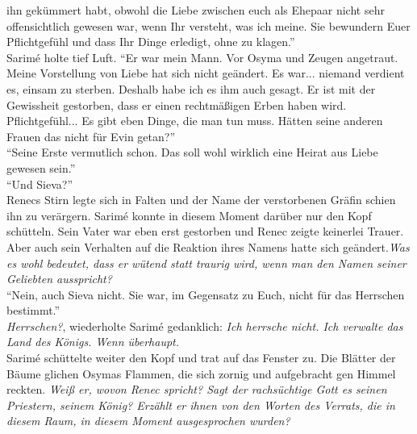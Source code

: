 ihn gekümmert habt, obwohl die Liebe zwischen euch als Ehepaar nicht sehr offensichtlich gewesen 
war, wenn Ihr versteht, was ich meine. Sie bewundern Euer Pflichtgefühl und dass Ihr Dinge 
erledigt, ohne zu klagen.''\\
Sarimé holte tief Luft. ``Er war mein Mann. Vor Osyma und Zeugen angetraut. Meine Vorstellung von 
Liebe hat sich nicht geändert. Es war... niemand verdient es, einsam zu sterben. Deshalb habe ich 
es ihm auch gesagt. Er ist mit der Gewissheit gestorben, dass er einen rechtmäßigen Erben haben 
wird. Pflichtgefühl... Es gibt eben Dinge, die man tun muss. Hätten seine anderen Frauen das nicht 
für Evin getan?''\\
``Seine Erste vermutlich schon. Das soll wohl wirklich eine Heirat aus Liebe gewesen sein.''\\
``Und Sieva?''\\
Renecs Stirn legte sich in Falten und der Name der verstorbenen Gräfin schien ihn zu verärgern. 
Sarimé konnte in diesem Moment darüber nur den Kopf schütteln. Sein Vater war eben erst gestorben 
und Renec zeigte keinerlei Trauer. Aber auch sein Verhalten auf die Reaktion ihres Namens hatte 
sich geändert.\textit{Was es wohl bedeutet, dass er wütend statt traurig wird, wenn man den Namen 
seiner Geliebten ausspricht?}\\
``Nein, auch Sieva nicht. Sie war, im Gegensatz zu Euch, nicht für das Herrschen bestimmt.''\\
\textit{Herrschen?}, wiederholte Sarimé gedanklich: \textit{Ich herrsche nicht. Ich verwalte das 
Land des Königs. Wenn überhaupt.}\\
Sarimé schüttelte weiter den Kopf und trat auf das Fenster zu. Die Blätter der Bäume glichen Osymas 
Flammen, die sich zornig und aufgebracht gen Himmel reckten. \textit{Weiß er, wovon Renec spricht? 
Sagt der rachsüchtige Gott es seinen Priestern, seinem König? Erzählt er ihnen von den Worten des 
Verrats, die in diesem Raum, in diesem Moment ausgesprochen wurden?}\\
